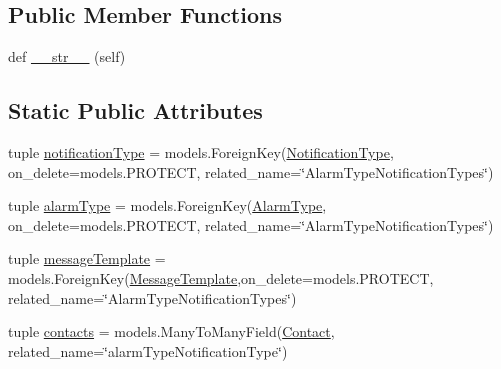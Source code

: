 \subsection*{Public Member Functions}
\begin{DoxyCompactItemize}
\item 
def \hyperlink{class_ground_segment_1_1models_1_1_notification_1_1_alarm_type_notification_type_1_1_alarm_type_notification_type_a038b5d3c7dd5fbbdb225843c1c552be5}{\+\_\+\+\_\+str\+\_\+\+\_\+} (self)
\end{DoxyCompactItemize}
\subsection*{Static Public Attributes}
\begin{DoxyCompactItemize}
\item 
tuple \hyperlink{class_ground_segment_1_1models_1_1_notification_1_1_alarm_type_notification_type_1_1_alarm_type_notification_type_adcaf2d8b90b3972c1288fd6e05affe82}{notification\+Type} = models.\+Foreign\+Key(\hyperlink{class_ground_segment_1_1models_1_1_notification_1_1_notification_type_1_1_notification_type}{Notification\+Type}, on\+\_\+delete=models.\+P\+R\+O\+T\+E\+C\+T, related\+\_\+name=\char`\"{}Alarm\+Type\+Notification\+Types\char`\"{})
\item 
tuple \hyperlink{class_ground_segment_1_1models_1_1_notification_1_1_alarm_type_notification_type_1_1_alarm_type_notification_type_aadf8abea727afcb6b9dd7a0cc7355206}{alarm\+Type} = models.\+Foreign\+Key(\hyperlink{class_ground_segment_1_1models_1_1_alarm_1_1_alarm_type_1_1_alarm_type}{Alarm\+Type}, on\+\_\+delete=models.\+P\+R\+O\+T\+E\+C\+T, related\+\_\+name=\char`\"{}Alarm\+Type\+Notification\+Types\char`\"{})
\item 
tuple \hyperlink{class_ground_segment_1_1models_1_1_notification_1_1_alarm_type_notification_type_1_1_alarm_type_notification_type_ab3c9522d5f6e0d6f4cb640240f98e384}{message\+Template} = models.\+Foreign\+Key(\hyperlink{class_ground_segment_1_1models_1_1_notification_1_1_message_template_1_1_message_template}{Message\+Template},on\+\_\+delete=models.\+P\+R\+O\+T\+E\+C\+T, related\+\_\+name=\char`\"{}Alarm\+Type\+Notification\+Types\char`\"{})
\item 
tuple \hyperlink{class_ground_segment_1_1models_1_1_notification_1_1_alarm_type_notification_type_1_1_alarm_type_notification_type_a066d4f1b841dc5989008f0613d8ebd73}{contacts} = models.\+Many\+To\+Many\+Field(\hyperlink{class_ground_segment_1_1models_1_1_notification_1_1_contact_1_1_contact}{Contact}, related\+\_\+name=\char`\"{}alarm\+Type\+Notification\+Type\char`\"{})
\end{DoxyCompactItemize}



